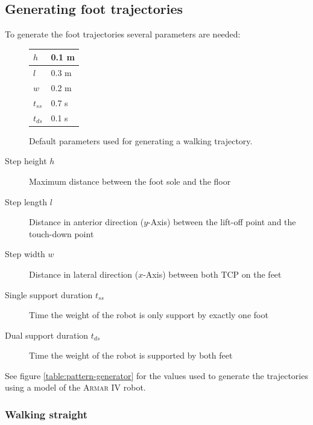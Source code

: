\documentclass[english,ngerman]{KITreprt}
\newcommand{\name}[1]{\textsc{#1}}
\begin{document}
\subsection{Generating foot
trajectories}\label{generating-foot-trajectories}

To generate the foot trajectories several parameters are needed:

\begin{figure}[b]
\begin{center}
  \begin{tabular}{| l | l |}
    \hline
    $h$ & 0.1 m \\ \hline
    $l$ & 0.3 m \\ \hline
    $w$ & 0.2 m \\ \hline
    $t_{ss}$ & 0.7 s\\ \hline
    $t_{ds}$ & 0.1 s\\ \hline
  \end{tabular}
\caption{Default parameters used for generating a walking trajectory.}
\label{table:pattern-parameters}
\end{center}
\end{figure}

\begin{description}
\item[Step height $h$]
Maximum distance between the foot sole and the floor
\item[Step length $l$]
Distance in anterior direction ($y$-Axis) between the lift-off point and
the touch-down point
\item[Step width $w$]
Distance in lateral direction ($x$-Axis) between both TCP on the feet
\item[Single support duration $t_{ss}$]
Time the weight of the robot is only support by exactly one foot
\item[Dual support duration $t_{ds}$]
Time the weight of the robot is supported by both feet
\end{description}

See figure \ref{table:pattern-generator} for the values used to generate
the trajectories using a model of the \name{Armar IV} robot.

\subsubsection{Walking straight}\label{walking-straight}
\end{document}
